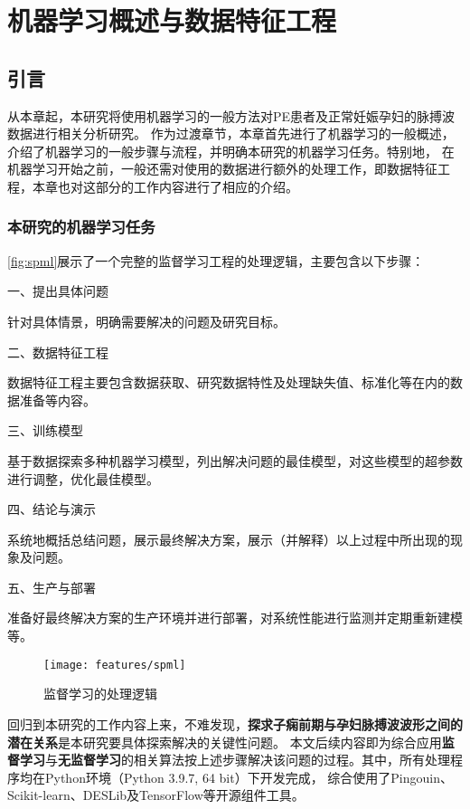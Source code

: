 \chapter{机器学习概述与数据特征工程}
\section{引言}
从本章起，本研究将使用机器学习的一般方法对PE患者及正常妊娠孕妇的脉搏波数据进行相关分析研究。
作为过渡章节，本章首先进行了机器学习的一般概述，介绍了机器学习的一般步骤与流程，并明确本研究的机器学习任务。特别地，
在机器学习开始之前，一般还需对使用的数据进行额外的处理工作，即数据特征工程，本章也对这部分的工作内容进行了相应的介绍。

\subsection{本研究的机器学习任务}
\autoref{fig:spml}展示了一个完整的监督学习工程的处理逻辑，主要包含以下步骤\cite{Aurélien2018}：

一、提出具体问题

针对具体情景，明确需要解决的问题及研究目标。

二、数据特征工程

数据特征工程主要包含数据获取、研究数据特性及处理缺失值、标准化等在内的数据准备等内容。

三、训练模型

基于数据探索多种机器学习模型，列出解决问题的最佳模型，对这些模型的超参数进行调整，优化最佳模型。

四、结论与演示

系统地概括总结问题，展示最终解决方案，展示（并解释）以上过程中所出现的现象及问题。

五、生产与部署

准备好最终解决方案的生产环境并进行部署，对系统性能进行监测并定期重新建模等。
\begin{figure}[htbp]
  \centering
  \texttt{[image: features/spml]}
  \caption[监督学习的处理逻辑]{\label{fig:spml}监督学习的处理逻辑\cite{awad2015}}
\end{figure}

回归到本研究的工作内容上来，不难发现，\textbf{探求子痫前期与孕妇脉搏波波形之间的潜在关系}是本研究要具体探索解决的关键性问题。
本文后续内容即为综合应用\textbf{监督学习}与\textbf{无监督学习}的相关算法按上述步骤解决该问题的过程。其中，所有处理程序均在Python环境（Python 3.9.7, 64 bit）下开发完成，
综合使用了Pingouin、Scikit-learn、DESLib及TensorFlow等开源组件工具\cite{python,Vallat2018,scikit-learn,JMLR:v21:18-144,tensorflow2015-whitepaper}。

